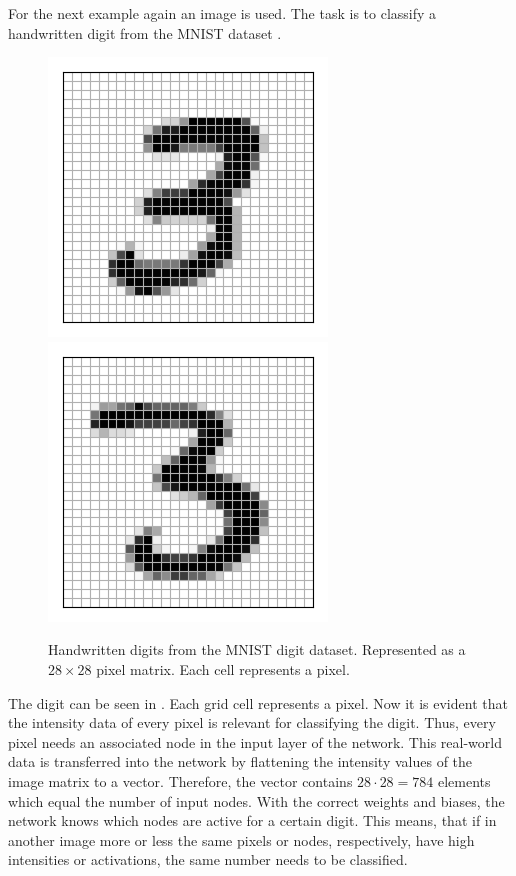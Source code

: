 For the next example again an image is used.
The task is to classify a handwritten digit from the MNIST dataset \cite{Lecun98}.
\begin{figure}
	\centering
	\includegraphics[]{images/mnist_digit_3a.png}
	\includegraphics[]{images/mnist_digit_3b.png}
	\caption[Handwritten digits from the MNIST digit dataset]{Handwritten digits from the MNIST digit dataset. Represented as a $28 \times 28$ pixel matrix. Each cell represents a pixel.}
	\label{fig:mnist-digit}
\end{figure}
The digit can be seen in .
Each grid cell represents a pixel.
Now it is evident that the intensity data of every pixel is relevant for classifying the digit.
Thus, every pixel needs an associated node in the input layer of the network.
This real-world data is transferred into the network by flattening the intensity values of the image matrix to a vector.
Therefore, the vector contains $28 \cdot 28 = 784$ elements which equal the number of input nodes.
With the correct weights and biases, the network knows which nodes are active for a certain digit.
This means, that if in another image more or less the same pixels or nodes, respectively, have high intensities or activations, the same number needs to be classified.
